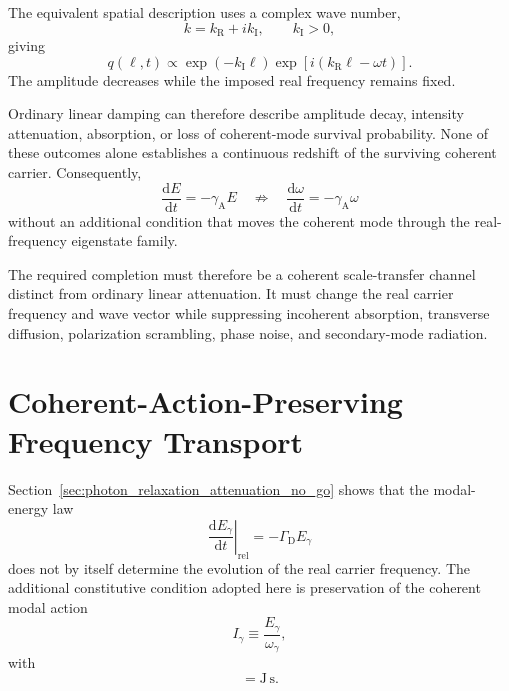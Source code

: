 The equivalent spatial description uses a complex wave number,
\begin{equation}
    k
    =
    k_{\mathrm R}
    +
    ik_{\mathrm I},
    \qquad
    k_{\mathrm I}>0,
    \label{eq:photon_relaxation_complex_wave_number}
\end{equation}
giving
\begin{equation}
    q(\ell,t)
    \propto
    \exp
    \left(
        -
        k_{\mathrm I}\ell
    \right)
    \exp
    \left[
        i
        \left(
            k_{\mathrm R}\ell
            -
            \omega t
        \right)
    \right].
    \label{eq:photon_relaxation_spatial_attenuation}
\end{equation}
The amplitude decreases while the imposed real frequency remains fixed.

Ordinary linear damping can therefore describe amplitude decay, intensity
attenuation, absorption, or loss of coherent-mode survival probability. None
of these outcomes alone establishes a continuous redshift of the surviving
coherent carrier. Consequently,
\begin{equation}
    \frac{
        \mathrm dE
    }{
        \mathrm dt
    }
    =
    -\gamma_{\mathrm A}E
    \quad
    \not\Rightarrow
    \quad
    \frac{
        \mathrm d\omega
    }{
        \mathrm dt
    }
    =
    -\gamma_{\mathrm A}\omega
    \label{eq:photon_relaxation_attenuation_no_go}
\end{equation}
without an additional condition that moves the coherent mode through the
real-frequency eigenstate family.

The required completion must therefore be a coherent scale-transfer channel
distinct from ordinary linear attenuation. It must change the real carrier
frequency and wave vector while suppressing incoherent absorption, transverse
diffusion, polarization scrambling, phase noise, and secondary-mode radiation.


\section{Coherent-Action-Preserving Frequency Transport}
\label{sec:photon_relaxation_frequency_transport}

Section~\ref{sec:photon_relaxation_attenuation_no_go} shows that the
modal-energy law
\begin{equation}
    \left.
    \frac{
        \mathrm dE_\gamma
    }{
        \mathrm dt
    }
    \right|_{\mathrm{rel}}
    =
    -\Gamma_{\mathrm D}E_\gamma
    \label{eq:photon_relaxation_transport_energy_law}
\end{equation}
does not by itself determine the evolution of the real carrier frequency. The
additional constitutive condition adopted here is preservation of the coherent
modal action
\begin{equation}
    I_\gamma
    \equiv
    \frac{
        E_\gamma
    }{
        \omega_\gamma
    },
    \label{eq:photon_relaxation_coherent_modal_action}
\end{equation}
with
\begin{equation}
    [I_\gamma]
    =
    \mathrm{J\,s}.
    \label{eq:photon_relaxation_coherent_modal_action_dimensions}
\end{equation}

